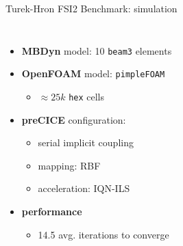 \documentclass[10pt,t]{beamer}
\begin{document}
\begin{frame}{Turek-Hron FSI2 Benchmark: simulation}
\begin{columns}
\footnotesize
\begin{itemize}
    \itemsep 10pt
    \item \textbf{MBDyn} model: 10 \texttt{beam3} elements
    \item \textbf{OpenFOAM} model: \texttt{pimpleFOAM}
    \begin{itemize}
        \item $\approx 25k$ \texttt{hex} cells
    \end{itemize}
    \item \textbf{preCICE} configuration:
    \begin{itemize}
        \item serial implicit coupling
        \item mapping: RBF
        \item acceleration: IQN-ILS
    \end{itemize}
    \item \textbf{performance}
    \begin{itemize}
        \item 14.5 avg. iterations to converge
    \end{itemize}
\end{itemize}

\end{columns}

\end{frame}
\end{document}
